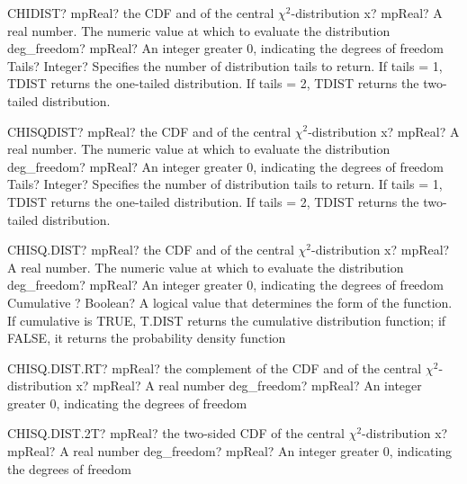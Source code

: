 \documentclass[12pt,a4paper,openany]{book}
\begin{document}
\begin{mpFunctionsExtract}
\mpWorksheetFunctionThreeNotImplemented
{CHIDIST? mpReal? the CDF and of the central $\chi^2$-distribution}
{x? mpReal? A real number. The numeric value at which to evaluate the distribution}
{deg\_freedom? mpReal? An integer  greater 0, indicating the degrees of freedom}
{Tails? Integer? Specifies the number of distribution tails to return. If tails = 1, TDIST returns the one-tailed distribution. If tails = 2, TDIST returns the two-tailed distribution.}
\end{mpFunctionsExtract}

\begin{mpFunctionsExtract}
\mpWorksheetFunctionThreeNotImplemented
{CHISQDIST? mpReal? the CDF and of the central $\chi^2$-distribution}
{x? mpReal? A real number. The numeric value at which to evaluate the distribution}
{deg\_freedom? mpReal? An integer  greater 0, indicating the degrees of freedom}
{Tails? Integer? Specifies the number of distribution tails to return. If tails = 1, TDIST returns the one-tailed distribution. If tails = 2, TDIST returns the two-tailed distribution.}
\end{mpFunctionsExtract}

\begin{mpFunctionsExtract}
\mpWorksheetFunctionThreeNotImplemented
{CHISQ.DIST? mpReal? the CDF and of the central $\chi^2$-distribution}
{x? mpReal? A real number. The numeric value at which to evaluate the distribution}
{deg\_freedom? mpReal? An integer  greater 0, indicating the degrees of freedom}
{Cumulative ? Boolean? A logical value that determines the form of the function. If cumulative is TRUE, T.DIST returns the cumulative distribution function; if FALSE, it returns the probability density function}
\end{mpFunctionsExtract}

\begin{mpFunctionsExtract}
\mpWorksheetFunctionTwoNotImplemented
{CHISQ.DIST.RT? mpReal? the complement of the CDF and of the central $\chi^2$-distribution}
{x? mpReal? A real number}
{deg\_freedom? mpReal? An integer  greater 0, indicating the degrees of freedom}
\end{mpFunctionsExtract}

\begin{mpFunctionsExtract}
\mpWorksheetFunctionTwoNotImplemented
{CHISQ.DIST.2T? mpReal? the two-sided CDF of the central $\chi^2$-distribution}
{x? mpReal? A real number}
{deg\_freedom? mpReal? An integer  greater 0, indicating the degrees of freedom}
\end{mpFunctionsExtract}
\end{document}
